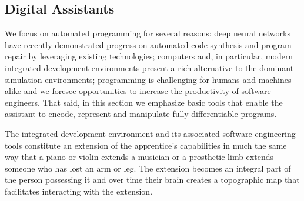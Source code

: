 \documentclass[letterpaper,11pt]{article}
\def\footnote#1{{}}
\begin{document}


\subsection{Digital Assistants}
\label{subsection_digital_assistants}



We focus on automated programming for several reasons: deep neural networks have recently demonstrated progress on automated code synthesis and program repair by leveraging existing technologies; computers and, in particular, modern integrated development environments present a rich alternative to the dominant simulation environments; programming is challenging for humans and machines alike and we foresee opportunities to increase the productivity of software engineers. That said, in this section we emphasize basic tools that enable the assistant to encode, represent and manipulate fully differentiable programs.




The integrated development environment and its associated software engineering tools constitute an extension of the apprentice’s capabilities in much the same way that a piano or violin extends a musician or a prosthetic limb extends someone who has lost an arm or leg. The extension becomes an integral part of the person possessing it and over time their brain creates a topographic map that facilitates interacting with the extension\footnote{%
%
  In the mammalian brain, information pertaining to sensing and motor control is topographically mapped to reflect the intrinsic structure of that information required for interpretation. This was early recognized in the work of Hubel and Wiesel~\cite{HubelandWieselJoP-68,HubelandWieselJoP-62} on the striate cortex of the cat and macaque monkey and in the work of Wilder Penfield~\cite{PenfieldandBoldreyBRAIN-37} developing the idea of a cortical homunculus in the primary motor and somatosensory areas of the brain located between the parietal and frontal lobes of the primate cortex. Such maps have become associated with the theory of embodied cognition.}. 
 
\end{document}
